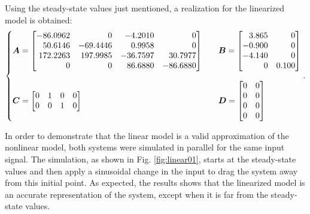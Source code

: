 \documentclass[a4paper,11pt]{book}
\numberwithin{figure}{chapter}
\numberwithin{equation}{chapter}
\numberwithin{table}{chapter}
\theoremstyle{definition}
\begin{document}
Using the steady-state values just mentioned, a realization for the linearized model is obtained:
\begin{align}   \label{eq:exoReact01}
\left\{ \begin{matrix*}[l]
    \bm{A} = \begin{bmatrix*}[r]
		  -86.0962 &        0 &  -4.2010 &        0 \\
		   50.6146 & -69.4446 &   0.9958 &        0 \\
		  172.2263 & 197.9985 & -36.7597 &  30.7977 \\
		         0 &       0  &  86.6880 & -86.6880
    \end{bmatrix*} \hfill & &
    \bm{B} = \begin{bmatrix*}[r]
		 3.865  &       0 \\
		-0.900  &       0 \\
		-4.140  &       0 \\
		      0  &  0.100
    \end{bmatrix*} \hfill \\  \\ 
    \bm{C} = \begin{bmatrix}
        0 & 1 & 0 & 0 \\ 0 & 0 & 1 & 0
    \end{bmatrix} \hfill & &
    \bm{D} = \begin{bmatrix}
        0 & 0 \\ 0 & 0 \\ 0 & 0 \\ 0 & 0
    \end{bmatrix} \hfill
\end{matrix*} \right.
.\end{align}

In order to demonstrate that the linear model is a valid approximation of the nonlinear model, both systems were simulated in parallel for the same input signal. The simulation, as shown in Fig. \ref{fig:linear01}, starts at the steady-state values and then apply a sinusoidal change in the input to drag the system away from this initial point. As expected, the results shows that the linearized model is an accurate representation of the system, except when it is far from the steady-state values.
\end{document}
